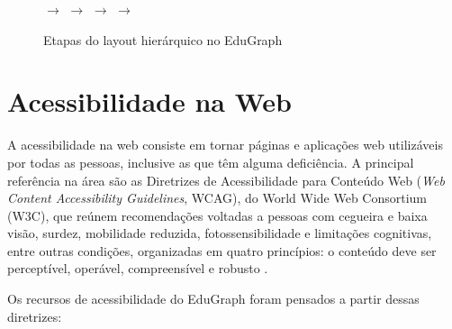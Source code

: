 \begin{figure}[H]
    \centering
    \caption{Etapas do layout hierárquico no EduGraph}
    \label{fig-vis-etapas-hierarquico}
    {\small
    \hfill$\rightarrow$\hfill
    \hfill$\rightarrow$\hfill
    \hfill$\rightarrow$\hfill
    \hfill$\rightarrow$\hfill
    }
\end{figure}



\section{Acessibilidade na Web}
\label{sec-referencial-acessibilidade}

A acessibilidade na web consiste em tornar páginas e aplicações web utilizáveis por todas as pessoas, inclusive as que têm alguma deficiência. A principal referência na área são as Diretrizes de Acessibilidade para Conteúdo Web (\textit{Web Content Accessibility Guidelines}, WCAG), do World Wide Web Consortium (W3C), que reúnem recomendações voltadas a pessoas com cegueira e baixa visão, surdez, mobilidade reduzida, fotossensibilidade e limitações cognitivas, entre outras condições, organizadas em quatro princípios: o conteúdo deve ser perceptível, operável, compreensível e robusto \cite{w3c2024wcag22}.

Os recursos de acessibilidade do EduGraph foram pensados a partir dessas diretrizes:

